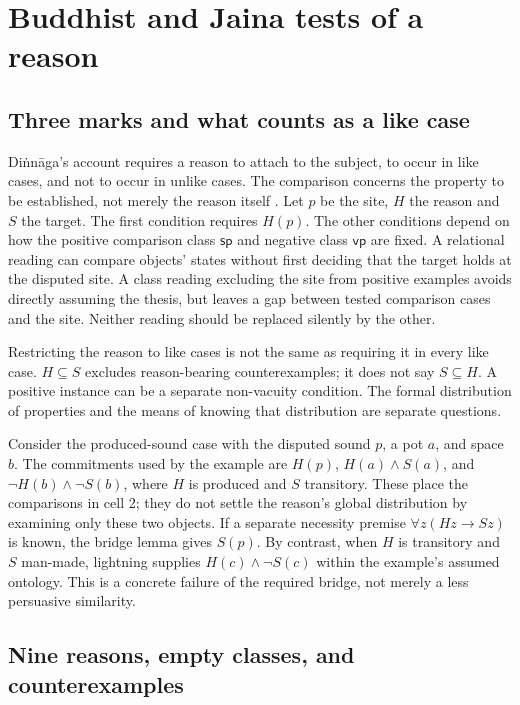 \section{Buddhist and Jaina tests of a reason}
\label{sec:p13-ganeri-reasons}

\subsection{Three marks and what counts as a like case}

Di\.nn\={a}ga's account requires a reason to attach to the subject, to occur in
like cases, and not to occur in unlike cases. The comparison concerns the
property to be established, not merely the reason itself
\cite[pp.~340--344]{Ganeri2004IndianLogicPublished}.
Let \(p\) be the site, \(H\) the reason and \(S\) the target.
The first condition requires \(H(p)\). The other conditions depend on how
the positive comparison class \(\mathsf{sp}\) and negative class
\(\mathsf{vp}\) are fixed. A relational reading can compare objects' states
without first deciding that the target holds at the disputed site.
A class reading excluding the site from positive examples avoids directly
assuming the thesis, but leaves a gap between tested comparison cases
and the site. Neither reading should be replaced silently by the other.

Restricting the reason to like cases is not the same as requiring it in
every like case. \(H\subseteq S\) excludes reason-bearing counterexamples;
it does not say \(S\subseteq H\). A positive instance can be a separate
non-vacuity condition. The formal distribution of properties and the means
of knowing that distribution are separate questions.

Consider the produced-sound case with the disputed sound \(p\), a pot \(a\),
and space \(b\). The commitments used by the example are \(H(p)\),
\(H(a)\land S(a)\), and \(\neg H(b)\land\neg S(b)\), where \(H\) is
produced and \(S\) transitory. These place the comparisons in cell 2;
they do not settle the reason's global distribution by examining only
these two objects. If a separate necessity premise
\(\forall z(Hz\to Sz)\) is known, the bridge lemma gives \(S(p)\).
By contrast, when \(H\) is transitory and \(S\) man-made, lightning supplies
\(H(c)\land\neg S(c)\) within the example's assumed ontology.
This is a concrete failure of the required bridge, not merely a less
persuasive similarity.

\subsection{Nine reasons, empty classes, and counterexamples}

